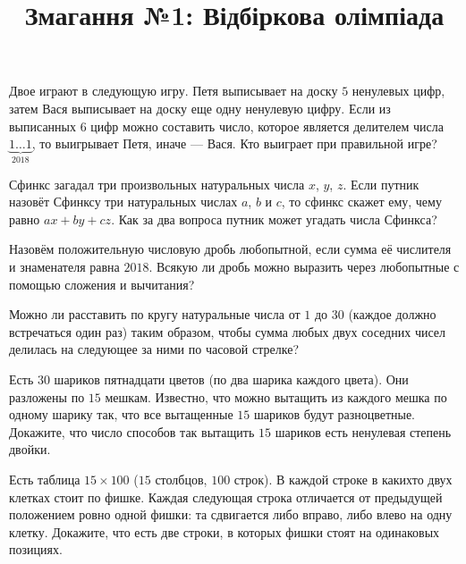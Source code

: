 



\title{Змагання №1: Відбіркова олімпіада}
\maketitle

\begin{problem}
	Двое играют в следующую игру. Петя выписывает на доску $5$ ненулевых цифр, затем Вася выписывает на доску еще одну ненулевую цифру. Если из выписанных $6$ цифр можно составить число, которое является делителем числа $\underset{2018}{\underbrace{1\ldots1}}$, то выигрывает Петя, иначе --- Вася. Кто выиграет при правильной игре?
\end{problem}

\begin{problem}
	Сфинкс загадал три произвольных натуральных числа $x$, $y$, $z$. Если путник назовёт Сфинксу три натуральных числах $a$, $b$ и $c$, то сфинкс скажет ему, чему равно $ax + by + cz$. Как за два вопроса путник может угадать числа Сфинкса?
\end{problem}

\begin{problem}
	Назовём положительную числовую дробь любопытной, если сумма её числителя и знаменателя равна $2018$. Всякую ли дробь можно выразить через любопытные с помощью сложения и вычитания?
\end{problem}

\begin{problem}
	Можно ли расставить по кругу натуральные числа от $1$ до $30$ (каждое должно встречаться один раз) таким образом, чтобы сумма любых двух соседних чисел делилась на следующее за ними по часовой стрелке?
\end{problem}

\begin{problem}
	Есть $30$ шариков пятнадцати цветов (по два шарика каждого цвета). Они разложены по $15$ мешкам. Известно, что можно вытащить из каждого мешка по одному шарику так, что все вытащенные $15$ шариков будут разноцветные. Докажите, что число способов так вытащить $15$ шариков есть ненулевая степень двойки.
\end{problem}

\begin{problem}
	Есть таблица $15 \times 100$ ($15$ столбцов, $100$ строк). В каждой строке в какихто двух клетках стоит по фишке. Каждая следующая строка отличается от предыдущей положением ровно одной фишки: та сдвигается либо вправо, либо влево на одну клетку. Докажите, что есть две строки, в которых фишки стоят на одинаковых позициях.
\end{problem}

